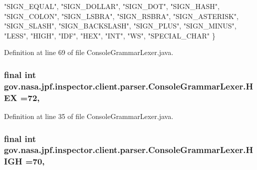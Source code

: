 \begin{DoxyCode}
    \textcolor{stringliteral}{"SIGN\_EQUAL"}, \textcolor{stringliteral}{"SIGN\_DOLLAR"}, \textcolor{stringliteral}{"SIGN\_DOT"}, \textcolor{stringliteral}{"SIGN\_HASH"}, \textcolor{stringliteral}{"SIGN\_COLON"}, \textcolor{stringliteral}{"SIGN\_LSBRA"}, 
    \textcolor{stringliteral}{"SIGN\_RSBRA"}, \textcolor{stringliteral}{"SIGN\_ASTERISK"}, \textcolor{stringliteral}{"SIGN\_SLASH"}, \textcolor{stringliteral}{"SIGN\_BACKSLASH"}, \textcolor{stringliteral}{"SIGN\_PLUS"}, 
    \textcolor{stringliteral}{"SIGN\_MINUS"}, \textcolor{stringliteral}{"LESS"}, \textcolor{stringliteral}{"HIGH"}, \textcolor{stringliteral}{"IDF"}, \textcolor{stringliteral}{"HEX"}, \textcolor{stringliteral}{"INT"}, \textcolor{stringliteral}{"WS"}, \textcolor{stringliteral}{"SPECIAL\_CHAR"}
  \}
\end{DoxyCode}


Definition at line 69 of file Console\+Grammar\+Lexer.\+java.

\subsubsection[{\texorpdfstring{H\+EX}{HEX}}]{\setlength{\rightskip}{0pt plus 5cm}final int gov.\+nasa.\+jpf.\+inspector.\+client.\+parser.\+Console\+Grammar\+Lexer.\+H\+EX =72\hspace{0.3cm}{\ttfamily [static]}, {\ttfamily [package]}}\hypertarget{classgov_1_1nasa_1_1jpf_1_1inspector_1_1client_1_1parser_1_1_console_grammar_lexer_ab6ca6b19769943c974fb1ce75bbc44b9}{}\label{classgov_1_1nasa_1_1jpf_1_1inspector_1_1client_1_1parser_1_1_console_grammar_lexer_ab6ca6b19769943c974fb1ce75bbc44b9}


Definition at line 35 of file Console\+Grammar\+Lexer.\+java.

\subsubsection[{\texorpdfstring{H\+I\+GH}{HIGH}}]{\setlength{\rightskip}{0pt plus 5cm}final int gov.\+nasa.\+jpf.\+inspector.\+client.\+parser.\+Console\+Grammar\+Lexer.\+H\+I\+GH =70\hspace{0.3cm}{\ttfamily [static]}, {\ttfamily [package]}}\hypertarget{classgov_1_1nasa_1_1jpf_1_1inspector_1_1client_1_1parser_1_1_console_grammar_lexer_a20ca6dd82a1a0840c895dee7adb78499}{}\label{classgov_1_1nasa_1_1jpf_1_1inspector_1_1client_1_1parser_1_1_console_grammar_lexer_a20ca6dd82a1a0840c895dee7adb78499}


